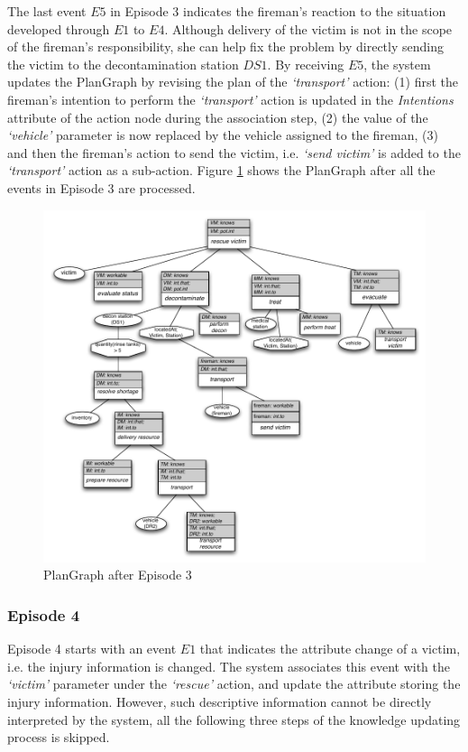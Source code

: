 The last event $E5$ in Episode 3 indicates the fireman's reaction to the situation developed through $E1$ to $E4$. Although delivery of the victim is not in the scope of the fireman's responsibility, she can help fix the problem by directly sending the victim to the decontamination station $DS1$. By receiving $E5$, the system updates the PlanGraph by revising the plan of the \emph{`transport'} action: (1) first the fireman's intention to perform the \emph{`transport'} action is updated in the \emph{Intentions} attribute of the action node during the association step, (2) the value of the \emph{`vehicle'} parameter is now replaced by the vehicle assigned to the fireman, (3) and then the fireman's action to send the victim, i.e. \emph{`send victim'} is added to the \emph{`transport'} action as a sub-action. Figure \ref{fig:plangraph_ep3} shows the PlanGraph after all the events in Episode 3 are processed.

\begin{figure}[htbp] %
	\centering
	\includegraphics[width=5.8in]{plangraph_ep3.pdf} 
	\caption{PlanGraph after Episode 3}
	\label{fig:plangraph_ep3}
\end{figure}

\subsubsection{Episode 4} %
\label{ssub:episode_4}
Episode 4 starts with an event $E1$ that indicates the attribute change of a victim, i.e. the injury information is changed. The system associates this event with the \emph{`victim'} parameter under the \emph{`rescue'} action, and update the attribute storing the injury information. However, such descriptive information cannot be directly interpreted by the system, all the following three steps of the knowledge updating process is skipped. 

